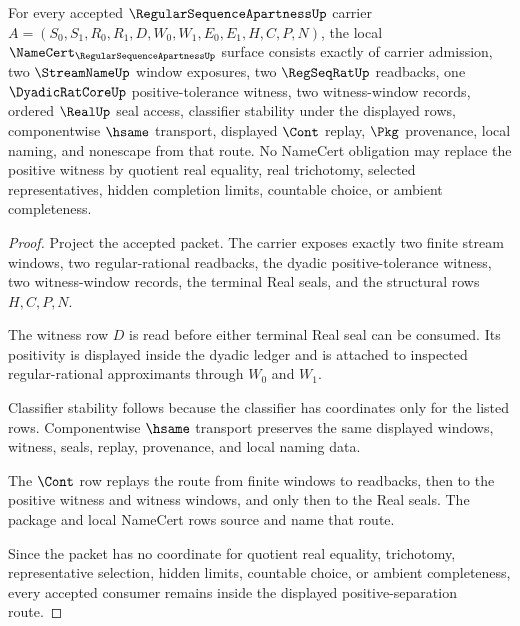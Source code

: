 \begin{theorem}
\label{thm:regular-sequence-apartness-namecert-obligations}
For every accepted $\RegularSequenceApartnessUp$ carrier $A=(S_0,S_1,R_0,R_1,D,W_0,W_1,E_0,E_1,H,C,P,N)$, the local $\NameCert_{\RegularSequenceApartnessUp}$ surface consists exactly of carrier admission, two $\StreamNameUp$ window exposures, two $\RegSeqRatUp$ readbacks, one $\DyadicRatCoreUp$ positive-tolerance witness, two witness-window records, ordered $\RealUp$ seal access, classifier stability under the displayed rows, componentwise $\hsame$ transport, displayed $\Cont$ replay, $\Pkg$ provenance, local naming, and nonescape from that route. No NameCert obligation may replace the positive witness by quotient real equality, real trichotomy, selected representatives, hidden completion limits, countable choice, or ambient completeness.
\end{theorem}
\begin{proof}
Project the accepted packet. The carrier exposes exactly two finite stream windows, two regular-rational readbacks, the dyadic positive-tolerance witness, two witness-window records, the terminal Real seals, and the structural rows $H,C,P,N$.

The witness row $D$ is read before either terminal Real seal can be consumed. Its positivity is displayed inside the dyadic ledger and is attached to inspected regular-rational approximants through $W_0$ and $W_1$.

Classifier stability follows because the classifier has coordinates only for the listed rows. Componentwise $\hsame$ transport preserves the same displayed windows, witness, seals, replay, provenance, and local naming data.

The $\Cont$ row replays the route from finite windows to readbacks, then to the positive witness and witness windows, and only then to the Real seals. The package and local NameCert rows source and name that route.

Since the packet has no coordinate for quotient real equality, trichotomy, representative selection, hidden limits, countable choice, or ambient completeness, every accepted consumer remains inside the displayed positive-separation route.
\end{proof}

